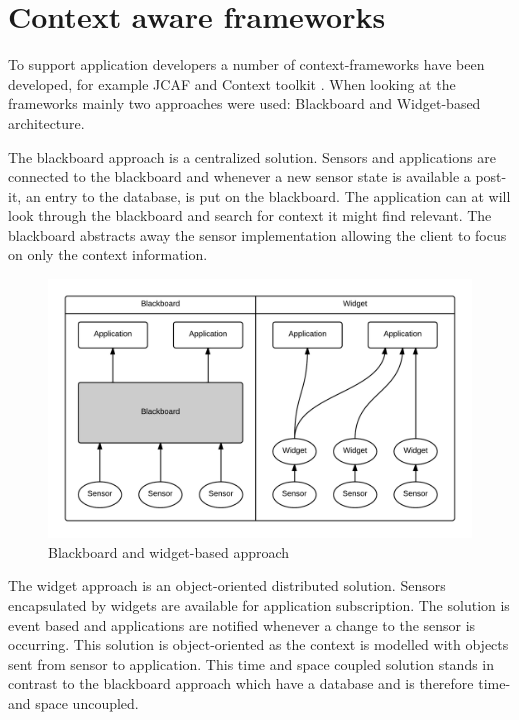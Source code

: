 \documentclass[../report.tex]{subfiles}
\begin{document}
\section{Context aware frameworks}
To support application developers a number of context-frameworks have been developed, for example JCAF and Context toolkit  \cite{Context-aware computing (2010)}. When looking at the frameworks mainly two approaches were used: Blackboard and Widget-based architecture.

The blackboard approach is a centralized solution. Sensors and applications are connected to the blackboard and whenever a new sensor state is available a post-it, an entry to the database, is put on the blackboard. The application can at will look through the blackboard and search for context it might find relevant. The blackboard abstracts away the sensor implementation allowing the client to focus on only the context information. 

\begin{figure}
\centering
\includegraphics[width=\linewidth]{blackboard-widget.png}
\caption{Blackboard and widget-based approach}
\label{fig:blackboard-widget}
\end{figure}



The widget approach is an object-oriented distributed solution. Sensors encapsulated by widgets are available for application subscription. The solution is event based and applications are notified whenever a change to the sensor is occurring. This solution is object-oriented as the context is modelled with objects sent from sensor to application. This time and space coupled solution stands in contrast to the blackboard approach which have a database and is therefore time- and space uncoupled.
\end{document}
